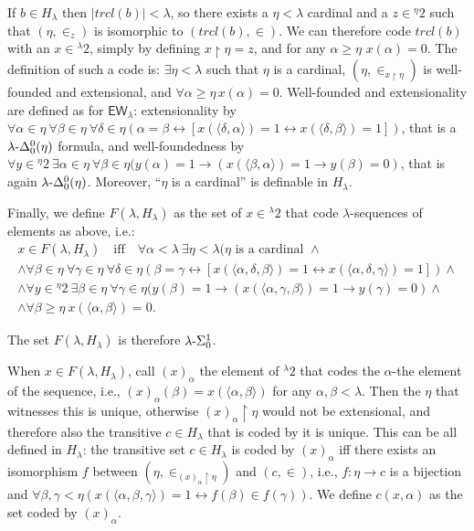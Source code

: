 \documentclass{amsart}
\numberwithin{equation}{section}
\def\hyp{{\hbox{-}}}
\theoremstyle{definition}
\theoremstyle{remark}
\begin{document}
If $b\in H_\lambda$ then $|trcl(b)|<\lambda$, so there exists a $\eta<\lambda$ cardinal and a $z\in{}^\eta 2$ such that $(\eta,\in_z)$ is isomorphic to $(trcl(b),\in)$. We can therefore code $trcl(b)$ with an $x\in{}^\lambda 2$, simply by defining $x\upharpoonright\eta=z$, and for any $\alpha\geq\eta$ $x(\alpha)=0$. The definition of such a code is: $\exists \eta<\lambda$ such that $\eta$ is a cardinal, $(\eta,\in_{x\upharpoonright\eta})$ is well-founded and extensional, and $\forall \alpha\geq\eta\, x(\alpha)=0$. Well-founded and extensionality are defined as for $\mathsf{EW}_\lambda$: extensionality by $\forall\alpha\in\eta\ \forall\beta\in\eta\ \forall\delta\in\eta(\alpha=\beta\leftrightarrow[x(\langle\delta,\alpha\rangle)=1\leftrightarrow x(\langle\delta,\beta\rangle)=1])$, that is a $\lambda\hyp\Delta^0_0(\eta)$ formula, and well-foundedness by $\forall y\in{}^{\eta}2\ \exists\alpha\in\eta\ \forall\beta\in\eta(y(\alpha)=1\rightarrow(x(\langle\beta,\alpha\rangle)=1\rightarrow y(\beta)=0)$, that is again $\lambda\hyp\Delta^0_0(\eta)$. Moreover, ``$\eta$ is a cardinal'' is definable in $H_\lambda$. 

Finally, we define $F(\lambda,H_\lambda)$ as the set of $x\in{}^\lambda 2$ that code $\lambda$-sequences of elements as above, i.e.:
\begin{gather*}
    x\in F(\lambda, H_\lambda)\quad\text{iff}\quad \forall\alpha<\lambda\ \exists \eta<\lambda (\eta\text{ is a cardinal }\land\\
    \land \forall\beta\in\eta\ \forall\gamma\in\eta\ \forall\delta\in\eta(\beta=\gamma\leftrightarrow[x(\langle\alpha,\delta,\beta\rangle)=1\leftrightarrow x(\langle\alpha,\delta,\gamma\rangle)=1])\land\\
    \land \forall y\in{}^{\eta}2\ \exists\beta\in\eta\ \forall\gamma\in\eta(y(\beta)=1\rightarrow(x(\langle\alpha,\gamma,\beta\rangle)=1\rightarrow y(\gamma)=0)\land\\
    \land\forall\beta\geq\eta\ x(\langle\alpha,\beta\rangle)=0.
\end{gather*}

The set $F(\lambda, H_\lambda)$ is therefore $\lambda\hyp\Sigma^1_0$.

When $x\in F(\lambda,H_\lambda)$, call $(x)_\alpha$ the element of ${}^\lambda 2$ that codes the $\alpha$-the element of the sequence, i.e., $(x)_\alpha(\beta)=x(\langle\alpha,\beta\rangle)$ for any $\alpha,\beta<\lambda$. Then the $\eta$ that witnesses this is unique, otherwise $(x)_\alpha\upharpoonright\eta$ would not be extensional, and therefore also the transitive $c\in H_\lambda$ that is coded by it is unique. This can be all defined in $H_\lambda$: the transitive set $c\in H_\lambda$ is coded by $(x)_\alpha$ iff there exists an isomorphism $f$ between $(\eta,\in_{(x)_\alpha\upharpoonright \eta})$ and $(c,\in)$, i.e., $f:\eta\to c$ is a bijection and $\forall\beta,\gamma<\eta (x(\langle\alpha,\beta,\gamma\rangle)=1 \leftrightarrow f(\beta)\in f(\gamma))$. We define $c(x,\alpha)$ as the set coded by $(x)_\alpha$.
\end{document}
